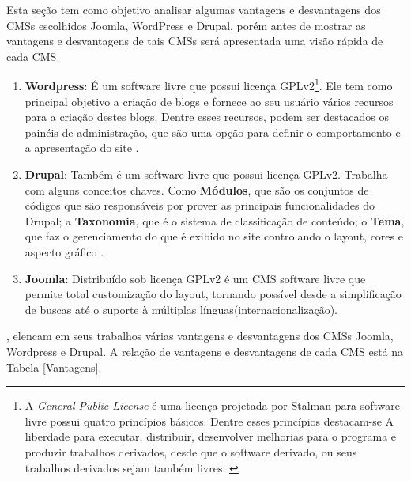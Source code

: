 Esta seção tem como objetivo analisar algumas vantagens e desvantagens dos CMSs escolhidos Joomla, WordPress e Drupal, porém antes de mostrar as vantagens e desvantagens de tais CMSs será apresentada uma visão rápida de cada CMS. 

\begin{enumerate}
 \item \textbf{Wordpress}: É um software livre que possui licença  GPLv2\footnote{A \textit{General Public License} é uma licença projetada por Stalman para software livre possui quatro princípios básicos. Dentre esses princípios destacam-se A liberdade para executar, distribuir, desenvolver melhorias para o programa e produzir trabalhos derivados, desde que o software derivado, ou seus trabalhos derivados sejam também livres. \cite{smith}}. Ele tem como principal objetivo a criação de blogs e fornece ao seu usuário vários recursos para a criação destes blogs. Dentre esses recursos, podem ser destacados os painéis de administração, que são uma opção para definir o comportamento e a apresentação do site \cite{Reis}.
 
\item \textbf{Drupal}: Também é um software livre que possui licença GPLv2. Trabalha com alguns conceitos chaves. Como \textbf{Módulos}, que são os conjuntos de códigos que são responsáveis por prover as principais funcionalidades do Drupal; a \textbf{Taxonomia}, que é o sistema de classificação de conteúdo;  o \textbf{Tema}, que faz o gerenciamento do que é exibido no site controlando o layout, cores e aspecto gráfico \cite{Reis}.  
 
 \item \textbf{Joomla}: Distribuído sob licença GPLv2 é um CMS software livre que permite total customização do layout, tornando possível desde a simplificação de buscas até o suporte à múltiplas línguas(internacionalização)\cite{Reis}. 
 \end{enumerate}

,  elencam em seus trabalhos várias vantagens e desvantagens dos CMSs Joomla, Wordpress e Drupal. A relação de vantagens e desvantagens de cada CMS está na Tabela \ref{Vantagens}.

\clearpage

